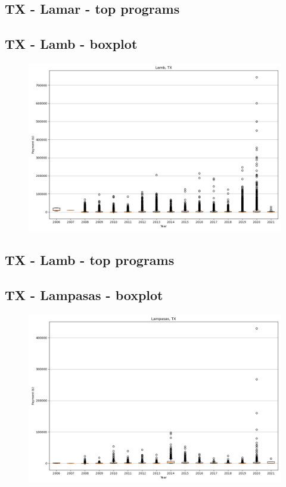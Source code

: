 \subsection*{TX - Lamar - top programs}

\newpage
\subsection*{TX - Lamb - boxplot}
\begin{figure}[h]
\centering
\includegraphics[width=7in]{../output/boxplots/counties/Lamb-TX_boxplot.png}
\end{figure}


\subsection*{TX - Lamb - top programs}

\newpage
\subsection*{TX - Lampasas - boxplot}
\begin{figure}[h]
\centering
\includegraphics[width=7in]{../output/boxplots/counties/Lampasas-TX_boxplot.png}
\end{figure}


